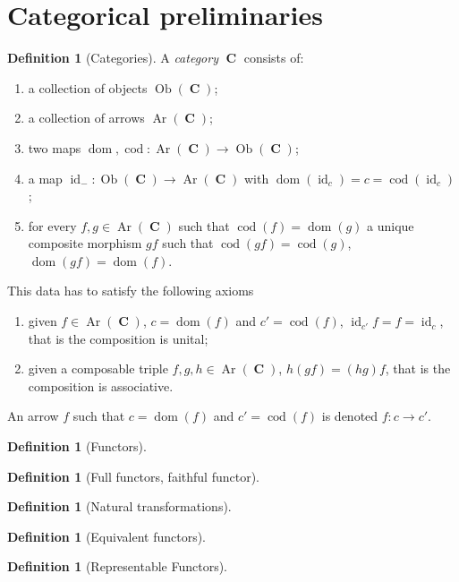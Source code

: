 \documentclass[a4paper,11pt,fullpage,oneside,openany]{amsbook}
\DeclareMathOperator{\C}{\mathbf{C}}
\DeclareMathOperator{\id}{id}
\DeclareMathOperator{\dom}{dom}
\DeclareMathOperator{\cod}{cod}
\DeclareMathOperator{\Ob}{Ob}
\DeclareMathOperator{\Ar}{Ar}
\theoremstyle{definition}
\theoremstyle{definition}
\newtheorem{defn}[thm]{Definition} %
\theoremstyle{remark}
\begin{document}
	\chapter*{Categorical preliminaries}
	\begin{defn}[Categories]
		A \emph{category} $\C$ consists of:
		\begin{enumerate}
			\item a collection of objects $\Ob(\C)$;
			\item a collection of arrows $\Ar(\C)$;
			\item two maps $\dom,\cod\colon\Ar(\C)\rightarrow\Ob(\C)$;
			\item a map $\id_{-}\colon\Ob(\C)\rightarrow\Ar(\C)$ with $\dom(\id_{c})=c=\cod(\id_{c})$;
			\item for every $f,g\in\Ar(\C)$ such that $\cod(f)=\dom(g)$ a unique composite morphism $gf$ such that $\cod(gf)=\cod(g)$, $\dom(gf)=\dom(f)$.
		\end{enumerate}
	This data has to satisfy the following axioms
		\begin{enumerate}
			\item given $f\in\Ar(\C)$, $c=\dom(f)$ and $c'=\cod(f)$, $\id_{c'}f=f=\id_{c}$, that is the composition is unital;
			\item given a composable triple $f,g,h\in\Ar(\C)$, $h(gf)=(hg)f$, that is the composition is associative.
		\end{enumerate}
		An arrow $f$ such that $c=\dom(f)$ and $c'=\cod(f)$ is denoted $f\colon c\rightarrow c'$.
	\end{defn}
	
	\begin{defn}[Functors]
		
	\end{defn}
	
	\begin{defn}[Full functors, faithful functor]
		
	\end{defn}
	
	\begin{defn}[Natural transformations]
		
	\end{defn}
	
	\begin{defn}[Equivalent functors]
	\end{defn}
	
	\begin{defn}[Representable Functors]
		
	\end{defn}
	
\end{document}
